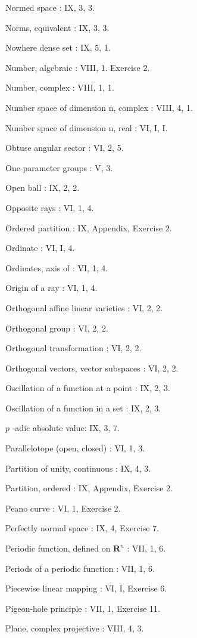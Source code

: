 Normed space : IX, 3, 3.

Norms, equivalent : IX, 3, 3.

Nowhere dense set : IX, 5, 1.

Number, algebraic : VIII, 1. Exercise 2.

Number, complex : VIII, 1, 1.

Number space of dimension n, complex : VIII, 4, 1.

Number space of dimension n, real : VI, I, I.

Obtuse angular sector : VI, 2, 5.

One-parameter groups : V, 3.

Open ball : IX, 2, 2.

Opposite rays : VI, 1, 4.

Ordered partition : IX, Appendix, Exercise 2.

Ordinate : VI, I, 4.

Ordinates, axis of : VI, 1, 4.

Origin of a ray : VI, 1, 4.

Orthogonal affine linear varieties : VI, 2, 2.

Orthogonal group : VI, 2, 2.

Orthogonal transformation : VI, 2, 2.

Orthogonal vectors, vector subspaces : VI, 2, 2.

Oscillation of a function at a point : IX, 2, 3.

Oscillation of a function in a set : IX, 2, 3.

\(p\) -adic absolute value: IX, 3, 7.

Parallelotope (open, closed) : VI, 1, 3.

Partition of unity, continuous : IX, 4, 3.

Partition, ordered : IX, Appendix, Exercise 2.

Peano curve : VI, 1, Exercise 2.

Perfectly normal space : IX, 4, Exercise 7.

Periodic function, defined on \(\mathbf{R}^n\) : VII, 1, 6.

Periods of a periodic function : VII, 1, 6.

Piecewise linear mapping : VI, I, Exercise 6.

Pigeon-hole principle : VII, 1, Exercise 11.

Plane, complex projective : VIII, 4, 3.

